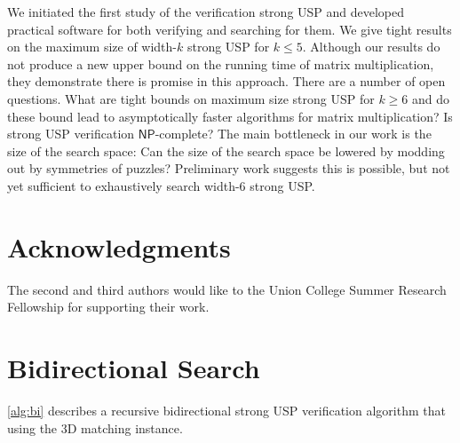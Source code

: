 \documentclass[11pt]{article}
\renewcommand\NP{\ensuremath{\mathsf{NP}}}
\begin{document}
We initiated the first study of the verification strong USP and
developed practical software for both verifying and searching for
them.  We give tight results on the maximum size of width-$k$
strong USP for $k \le 5$.  Although our results do not produce a new
upper bound on the running time of matrix multiplication, they
demonstrate there is promise in this approach. %
There are a number of open questions.
What are tight bounds on maximum size
strong USP for $k \ge 6$ and do these bound lead to asymptotically
faster algorithms for matrix multiplication?
Is strong USP verification \NP-complete?
The main bottleneck in
our work is the size of the search space:
Can the size of the search space be lowered by modding out by symmetries of puzzles?  Preliminary work
suggests this is possible, but not yet sufficient to exhaustively
search width-6 strong USP.

\section{Acknowledgments}

The second and third authors would like to the Union College
Summer Research Fellowship for supporting their work.

 

\appendix

\section{Bidirectional Search}

\label{app:bi}

\autoref{alg:bi} describes a recursive
bidirectional strong USP verification algorithm that using the 3D
matching instance.
\end{document}

